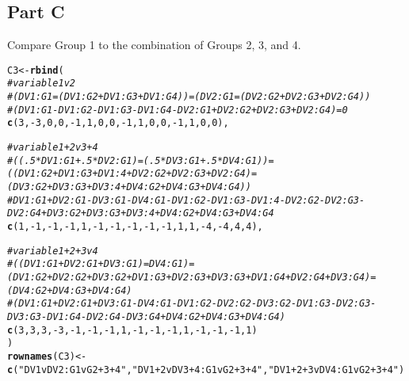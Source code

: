 \documentclass{article}\usepackage[]{graphicx}\usepackage[]{color}
\makeatletter
\newcommand{\hlnum}[1]{\textcolor[rgb]{0.686,0.059,0.569}{#1}}%
\newcommand{\hlstr}[1]{\textcolor[rgb]{0.192,0.494,0.8}{#1}}%
\newcommand{\hlcom}[1]{\textcolor[rgb]{0.678,0.584,0.686}{\textit{#1}}}%
\newcommand{\hlopt}[1]{\textcolor[rgb]{0,0,0}{#1}}%
\newcommand{\hlstd}[1]{\textcolor[rgb]{0.345,0.345,0.345}{#1}}%
\newcommand{\hlkwb}[1]{\textcolor[rgb]{0.69,0.353,0.396}{#1}}%
\newcommand{\hlkwd}[1]{\textcolor[rgb]{0.737,0.353,0.396}{\textbf{#1}}}%
\newenvironment{kframe}{%
 \def\at@end@of@kframe{}%
 \ifinner\ifhmode%
  \def\at@end@of@kframe{\end{minipage}}%
  \begin{minipage}{\columnwidth}%
 \fi\fi%
 \def\FrameCommand##1{\hskip\@totalleftmargin \hskip-\fboxsep
 \colorbox{shadecolor}{##1}\hskip-\fboxsep
     \hskip-\linewidth \hskip-\@totalleftmargin \hskip\columnwidth}%
 \MakeFramed {\advance\hsize-\width
   \@totalleftmargin\z@ \linewidth\hsize
   \@setminipage}}%
 {\par\unskip\endMakeFramed%
 \at@end@of@kframe}
\newenvironment{knitrout}{}{} %
\makeatother
\begin{document}
\subsection{Part C}
Compare Group 1 to the combination of Groups 2, 3, and 4.
\begin{knitrout}
\color{fgcolor}\begin{kframe}
\begin{alltt}
\hlstd{C3} \hlkwb{<-} \hlkwd{rbind}\hlstd{(}
  \hlcom{# variable 1 v 2}
  \hlcom{# (DV1:G1 = (DV1:G2 + DV1:G3 + DV1:G4)) = (DV2:G1 = (DV2:G2 + DV2:G3 + DV2:G4))}
  \hlcom{# (DV1:G1 - DV1:G2 - DV1:G3 - DV1:G4 - DV2:G1 + DV2:G2 + DV2:G3 + DV2:G4) = 0}
  \hlkwd{c}\hlstd{(}\hlnum{3}\hlstd{,}\hlopt{-}\hlnum{3}\hlstd{,}\hlnum{0}\hlstd{,}\hlnum{0}\hlstd{,} \hlopt{-}\hlnum{1}\hlstd{,}\hlnum{1}\hlstd{,}\hlnum{0}\hlstd{,}\hlnum{0}\hlstd{,} \hlopt{-}\hlnum{1}\hlstd{,}\hlnum{1}\hlstd{,}\hlnum{0}\hlstd{,}\hlnum{0}\hlstd{,} \hlopt{-}\hlnum{1}\hlstd{,}\hlnum{1}\hlstd{,}\hlnum{0}\hlstd{,}\hlnum{0}\hlstd{),}

  \hlcom{# variable 1 + 2 v 3 + 4}
  \hlcom{# ((.5*DV1:G1 + .5*DV2:G1) = (.5*DV3:G1 + .5*DV4:G1)) = ((DV1:G2 + DV1:G3 + DV1:4 + DV2:G2 + DV2:G3 + DV2:G4) = (DV3:G2 + DV3:G3 + DV3:4 + DV4:G2 + DV4:G3 + DV4:G4))}
  \hlcom{# DV1:G1 + DV2:G1 - DV3:G1 - DV4:G1 - DV1:G2 -  DV1:G3 - DV1:4 - DV2:G2 - DV2:G3 - DV2:G4 + DV3:G2 + DV3:G3 + DV3:4 + DV4:G2 + DV4:G3 + DV4:G4}
  \hlkwd{c}\hlstd{(}\hlnum{1}\hlstd{,}\hlopt{-}\hlnum{1}\hlstd{,}\hlopt{-}\hlnum{1}\hlstd{,}\hlopt{-}\hlnum{1}\hlstd{,}  \hlnum{1}\hlstd{,}\hlopt{-}\hlnum{1}\hlstd{,}\hlopt{-}\hlnum{1}\hlstd{,}\hlopt{-}\hlnum{1}\hlstd{,}  \hlopt{-}\hlnum{1}\hlstd{,}\hlopt{-}\hlnum{1}\hlstd{,}\hlnum{1}\hlstd{,}\hlnum{1}\hlstd{,}  \hlopt{-}\hlnum{4}\hlstd{,}\hlopt{-}\hlnum{4}\hlstd{,}\hlnum{4}\hlstd{,}\hlnum{4}\hlstd{),}

  \hlcom{# variable 1 + 2 + 3 v 4}
  \hlcom{# ((DV1:G1 + DV2:G1 + DV3:G1) = DV4:G1) = (DV1:G2 + DV2:G2 + DV3:G2 + DV1:G3 + DV2:G3 + DV3:G3 + DV1:G4 + DV2:G4 + DV3:G4) = (DV4:G2 + DV4:G3 + DV4:G4)}
  \hlcom{# (DV1:G1 + DV2:G1 + DV3:G1 - DV4:G1 - DV1:G2 - DV2:G2 - DV3:G2 - DV1:G3 - DV2:G3 - DV3:G3 - DV1:G4 - DV2:G4 - DV3:G4 + DV4:G2 + DV4:G3 + DV4:G4)}
  \hlkwd{c}\hlstd{(}\hlnum{3}\hlstd{,}\hlnum{3}\hlstd{,}\hlnum{3}\hlstd{,}\hlopt{-}\hlnum{3}\hlstd{,} \hlopt{-}\hlnum{1}\hlstd{,}\hlopt{-}\hlnum{1}\hlstd{,}\hlopt{-}\hlnum{1}\hlstd{,}\hlnum{1}\hlstd{,} \hlopt{-}\hlnum{1}\hlstd{,}\hlopt{-}\hlnum{1}\hlstd{,}\hlopt{-}\hlnum{1}\hlstd{,}\hlnum{1}\hlstd{,} \hlopt{-}\hlnum{1}\hlstd{,}\hlopt{-}\hlnum{1}\hlstd{,}\hlopt{-}\hlnum{1}\hlstd{,}\hlnum{1}\hlstd{)}
\hlstd{)}
\hlkwd{rownames}\hlstd{(C3)} \hlkwb{<-} \hlkwd{c}\hlstd{(}\hlstr{"DV1vDV2:G1vG2+3+4"}\hlstd{,} \hlstr{"DV1+2vDV3+4:G1vG2+3+4"}\hlstd{,} \hlstr{"DV1+2+3vDV4:G1vG2+3+4"}\hlstd{)}
\end{alltt}
\end{kframe}
\end{knitrout}
\end{document}
